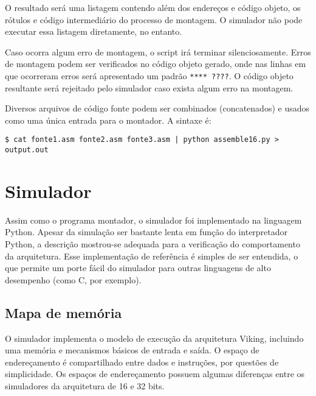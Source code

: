 \documentclass{extreport}
\begin{document}
O resultado será uma listagem contendo além dos endereços e código objeto, os rótulos e código intermediário do processo de montagem. O simulador não pode executar essa listagem diretamente, no entanto.



Caso ocorra algum erro de montagem, o script irá terminar silenciosamente. Erros de montagem podem ser verificados no código objeto gerado, onde nas linhas em que ocorreram erros será apresentado um padrão \texttt{**** ????}. O código objeto resultante será rejeitado pelo simulador caso exista algum erro na montagem.

Diversos arquivos de código fonte podem ser combinados (concatenados) e usados como uma única entrada para o montador. A sintaxe é:

\begin{verbatim}
$ cat fonte1.asm fonte2.asm fonte3.asm | python assemble16.py > output.out
\end{verbatim}

\section{Simulador}

Assim como o programa montador, o simulador foi implementado na linguagem Python. Apesar da simulação ser bastante lenta em função do interpretador Python, a descrição mostrou-se adequada para a verificação do comportamento da arquitetura. Esse implementação de referência é simples de ser entendida, o que permite um porte fácil do simulador para outras linguagens de alto desempenho (como C, por exemplo).

\subsection{Mapa de memória}

O simulador implementa o modelo de execução da arquitetura Viking, incluindo uma memória e mecanismos básicos de entrada e saída. O espaço de endereçamento é compartilhado entre dados e instruções, por questões de simplicidade. Os espaços de endereçamento possuem algumas diferenças entre os simuladores da arquitetura de 16 e 32 bits.
\end{document}
